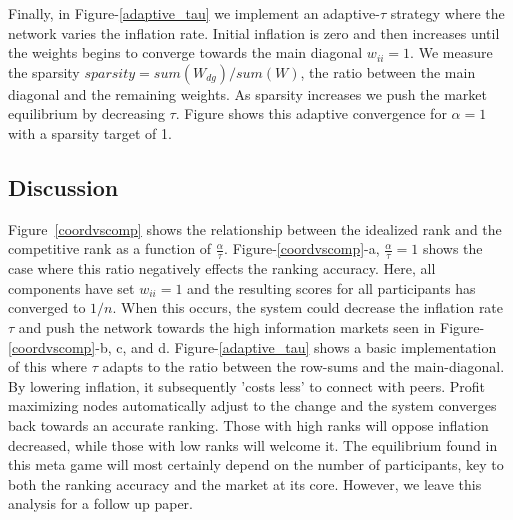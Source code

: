 \documentclass{article}
\begin{document}
Finally, in Figure-\ref{adaptive_tau} we implement an adaptive-$\tau$ strategy where the network varies the inflation rate. Initial inflation is zero and then increases until the weights begins to converge towards the main diagonal $w_{ii}=1$. We measure the sparsity $sparsity = sum(W_{dg})/sum(W)$, the ratio between the main diagonal and the remaining weights. As sparsity increases we push the market equilibrium by decreasing $\tau$. Figure shows this adaptive convergence for $\alpha=1$ with a sparsity target of 1.
\smallskip

\subsection{Discussion}

Figure~\ref{coordvscomp} shows the relationship between the idealized rank and the competitive rank as a function of $\frac{\alpha}{\tau}$. Figure-\ref{coordvscomp}-a, $\frac{\alpha}{\tau} = 1$ shows the case where this ratio negatively effects the ranking accuracy. Here, all components have set $w_{ii} = 1$ and the resulting scores for all participants has converged to $1/n$. When this occurs, the system could decrease the inflation rate $\tau$ and push the network towards the high information markets seen in Figure-\ref{coordvscomp}-b, c, and d. Figure-\ref{adaptive_tau} shows a basic implementation of this where $\tau$ adapts to the ratio between the row-sums and the main-diagonal. By lowering inflation, it subsequently 'costs less' to connect with peers. Profit maximizing nodes automatically adjust to the change and the system converges back towards an accurate ranking. Those with high ranks will oppose inflation decreased, while those with low ranks will welcome it. The equilibrium found in this meta game will most certainly depend on the number of participants, key to both the ranking accuracy and the market at its core. However, we leave this analysis for a follow up paper. 
\smallskip
\end{document}
